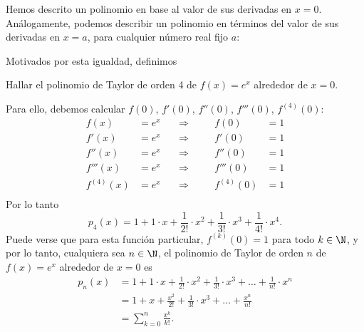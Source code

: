 Hemos descrito un polinomio en base al valor de sus derivadas en $x=0$.
Análogamente, podemos describir un polinomio en términos del valor de sus derivadas en $x=a$, para cualquier número real fijo $a$:


Motivados por esta igualdad, definimos


\begin{ejemplo}
 Hallar el polinomio de Taylor de orden 4 de $f(x) = e^x$ alrededor de $x=0$.

 Para ello, debemos calcular $f(0)$, $f'(0)$, $f''(0)$, $f'''(0)$, $f^{(4)}(0)$:
\[
\begin{aligned}
 f(x) &= e^x  \quad &\Longrightarrow & &\quad f(0)  &= 1 \\
 f'(x) &= e^x \quad &\Longrightarrow& & \quad f'(0) &= 1 \\
 f''(x) &= e^x \quad &\Longrightarrow& & \quad f''(0) &= 1 \\
 f'''(x) &= e^x \quad &\Longrightarrow& & \quad f'''(0) &= 1 \\
 f^{(4)}(x) &= e^x \quad &\Longrightarrow& & \quad f^{(4)}(0) &= 1 \\
\end{aligned}
\]
Por lo tanto 
\[
 p_4(x) = 1 + 1 \cdot x + \frac{1}{2!} \cdot x^2 + \frac{1}{3!} \cdot x^3 +  \frac{1}{4!} \cdot x^4 .
\]
Puede verse que para esta función particular, $f^{(k)}(0) = 1$ para todo $k \in \N$, y por lo tanto, cualquiera sea $n\in\N$, el polinomio de Taylor de orden $n$ de $f(x) = e^x$ alrededor de $x=0$ es
\begin{align*}
 p_n(x) &= 1 + 1 \cdot x + \frac{1}{2!} \cdot x^2 + \frac{1}{3!} \cdot x^3 +\dots +  \frac{1}{n!} \cdot x^n \\
&= 1 +  x + \frac{x^2}{2!} + \frac{1}{3!} \cdot x^3 + \dots +  \frac{x^n}{n!}  \\
&= \sum_{k=0}^n \frac{x^k}{k!}.
\end{align*}

\end{ejemplo}

